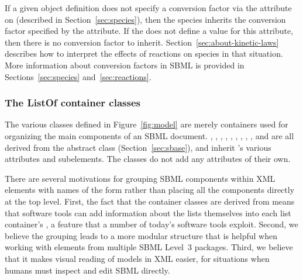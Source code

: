 If a given \Species object definition does not specify a
conversion factor via the  attribute on
\Species (described in Section~\ref{sec:species}), then the
species inherits the conversion factor specified by the \Model
{} attribute.  If the \Model does not define
a value for this attribute, then there is no conversion factor to
inherit.  Section~\ref{sec:about-kinetic-laws} describes how to
interpret the effects of reactions on species in that situation.
More information about conversion factors in SBML is provided in
Sections~\ref{sec:species} and~\ref{sec:reactions}.


\subsubsection{The ListOf container classes}
\label{sec:listof}
\label{sec:listofunitdefinitions}
\label{sec:listoffunctiondefinitions}
\label{sec:listofcompartments}
\label{sec:listofspecies}
\label{sec:listofparameters}
\label{sec:listofinitialassignments}
\label{sec:listofinitialassign}
\label{sec:listofrules}
\label{sec:listofconstraints}
\label{sec:listofreactions}
\label{sec:listofevents}

The various \ListOf classes defined in Figure~\ref{fig:model} are
merely containers used for organizing the main components of an
SBML document.  \ListOfFunctionDefinitions,
\ListOfUnitDefinitions, \ListOfCompartments, \ListOfSpecies,
\ListOfParameters, \ListOfInitialAssignments, \ListOfRules,
\ListOfConstraints, \ListOfReactions, and \ListOfEvents are all
derived from the abstract class \SBase (Section~\ref{sec:sbase}),
and inherit \SBase's various attributes and subelements.  The
\ListOf classes do not add any attributes of their own.

There are several motivations for grouping SBML components within
XML elements with names of the form 
rather than placing all the components directly at the top level.
First, the fact that the container classes are derived from \SBase
means that software tools can add information about the lists
themselves into each list container's \Annotation, a feature that
a number of today's software tools exploit.  Second, we believe
the grouping leads to a more modular structure that is helpful
when working with elements from multiple SBML Level~3 packages.
Third, we believe that it makes visual reading of models in XML
easier, for situations when humans must inspect and edit SBML
directly.


